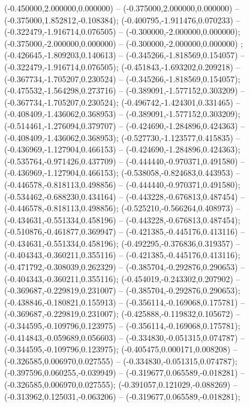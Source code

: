  (-0.450000,2.000000,0.000000) -- (-0.375000,2.000000,0.000000) -- (-0.375000,1.852812,-0.108384);
 (-0.400795,-1.911476,0.070233) -- (-0.322479,-1.916714,0.076505) -- (-0.300000,-2.000000,0.000000);
 (-0.375000,-2.000000,0.000000) -- (-0.300000,-2.000000,0.000000) ;
 (-0.426645,-1.809203,0.140613) -- (-0.345266,-1.818569,0.154057) -- (-0.322479,-1.916714,0.076505);
 (-0.451843,-1.693202,0.209218) -- (-0.367734,-1.705207,0.230524) -- (-0.345266,-1.818569,0.154057);
 (-0.475532,-1.564298,0.273716) -- (-0.389091,-1.577152,0.303209) -- (-0.367734,-1.705207,0.230524);
 (-0.496742,-1.424301,0.331465) -- (-0.408409,-1.436062,0.368953) -- (-0.389091,-1.577152,0.303209);
 (-0.514461,-1.276094,0.379707) -- (-0.424690,-1.284896,0.424363) -- (-0.408409,-1.436062,0.368953);
 (-0.527730,-1.123577,0.415835) -- (-0.436969,-1.127904,0.466153) -- (-0.424690,-1.284896,0.424363);
 (-0.535764,-0.971426,0.437709) -- (-0.444440,-0.970371,0.491580) -- (-0.436969,-1.127904,0.466153);
 (-0.538058,-0.824683,0.443953) -- (-0.446578,-0.818113,0.498856) -- (-0.444440,-0.970371,0.491580);
 (-0.534462,-0.688230,0.434164) -- (-0.443228,-0.676813,0.487454) -- (-0.446578,-0.818113,0.498856);
 (-0.525210,-0.566264,0.408973) -- (-0.434631,-0.551334,0.458196) -- (-0.443228,-0.676813,0.487454);
 (-0.510876,-0.461877,0.369947) -- (-0.421385,-0.445176,0.413116) -- (-0.434631,-0.551334,0.458196);
 (-0.492295,-0.376836,0.319357) -- (-0.404343,-0.360211,0.355116) -- (-0.421385,-0.445176,0.413116);
 (-0.471792,-0.308039,0.262329) -- (-0.385704,-0.292876,0.290653) -- (-0.404343,-0.360211,0.355116);
 (-0.454019,-0.243302,0.207902) -- (-0.369687,-0.229819,0.231007) -- (-0.385704,-0.292876,0.290653);
 (-0.438846,-0.180821,0.155913) -- (-0.356114,-0.169068,0.175781) -- (-0.369687,-0.229819,0.231007);
 (-0.425888,-0.119832,0.105672) -- (-0.344595,-0.109796,0.123975) -- (-0.356114,-0.169068,0.175781);
 (-0.414843,-0.059689,0.056603) -- (-0.334830,-0.051315,0.074787) -- (-0.344595,-0.109796,0.123975);
 (-0.405475,0.000171,0.008208) -- (-0.326585,0.006970,0.027555) -- (-0.334830,-0.051315,0.074787);
 (-0.397596,0.060255,-0.039949) -- (-0.319677,0.065589,-0.018281) -- (-0.326585,0.006970,0.027555);
 (-0.391057,0.121029,-0.088269) -- (-0.313962,0.125031,-0.063206) -- (-0.319677,0.065589,-0.018281);
